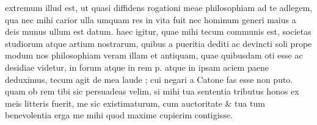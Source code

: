  extremum illud est, ut quasi diffidens rogationi meae philosophiam ad te adlegem, qua nec mihi carior ulla umquam res in vita fuit nec hominum generi maius a deis munus ullum est datum. haec igitur, quae mihi tecum communis est, societas studiorum atque artium nostrarum, quibus a pueritia dediti ac devincti soli prope modum nos philosophiam veram illam et antiquam, quae quibusdam oti esse ac desidiae videtur, in forum atque in rem p. atque in ipsam aciem paene deduximus, tecum agit de mea laude ; cui negari a Catone fas esse non puto. quam ob rem tibi sic persuadeas velim, si mihi tua sententia tributus honos ex meis litteris fuerit, me sic existimaturum, cum auctoritate & tua tum benevolentia erga me mihi quod maxime cupierim contigisse.
